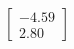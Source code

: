 \documentclass[preview]{standalone}
\begin{document}
\begin{align*}
\begin{bmatrix} -4.59 \\ 2.80 \end{bmatrix}
\end{align*}
\end{document}
